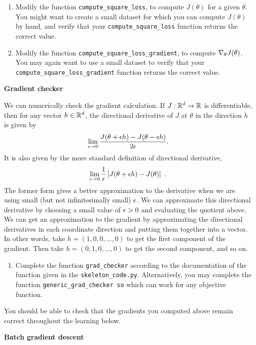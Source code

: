 \documentclass{article}
\newcommand{\nyuparagrah}[1]{\textcolor{nyupurple}{\large #1}}
\begin{document}
\begin{enumerate}
\item Modify the function \texttt{compute\_square\_loss}, to compute $J(\theta)$
for a given $\theta$. You might want to create a small dataset for
which you can compute $J(\theta)$ by hand, and verify that your \texttt{compute\_square\_loss}
function returns the correct value.

\item Modify the function \texttt{compute\_square\_loss\_gradient}, to compute
$\nabla_{\theta}J(\theta)$. You may again want to use a small dataset
to verify that your \texttt{compute\_square\_loss\_gradient} function
returns the correct value.
\setcounter{saveenum}{\value{enumi}}
\end{enumerate}

\nyuparagrah{\bf Gradient checker}

We can numerically check the
gradient calculation. If $J:\mathbb{R}^{d}\to\mathbb{R}$ is differentiable,
then for any vector $h\in\mathbb{R}^{d}$, the directional derivative
of $J$ at $\theta$ in the direction $h$ is given by
\[
\lim_{{\epsilon}\to0}\frac{J(\theta+{\epsilon} h)-J(\theta-{\epsilon} h)}{2{\epsilon}}.
\]
It is also given by the more standard definition of directional
derivative, $$\lim_{{\epsilon}\to0}\frac{1}{{\epsilon}}\left[J(\theta+{\epsilon} h)-J(\theta)\right] \ .$$
The former form gives a better approximation to the derivative when
we are using small (but not infinitesimally small) ${\epsilon}$. We can approximate this directional derivative by choosing a small
value of ${\epsilon}>0$ and evaluating the quotient above. We can get an
approximation to the gradient by approximating the directional derivatives
in each coordinate direction and putting them together into a vector.
In other words, take $h=\left(1,0,0,\ldots,0\right)$ to get the first
component of the gradient. Then take $h=(0,1,0,\ldots,0)$ to get
the second component, and so on. 

\begin{enumerate}
\setcounter{enumi}{\value{saveenum}}
\item Complete the function \texttt{grad\_checker} according to the documentation of the function given in the \texttt{skeleton\_code.py}. Alternatively, you may complete the function \texttt{generic\_grad\_checker
so} which can work for any objective function. 

\setcounter{saveenum}{\value{enumi}}
\end{enumerate}
You should be able to check that the gradients you computed above remain correct throughout the learning below.

\nyuparagrah{\bf Batch gradient descent}
\end{document}
